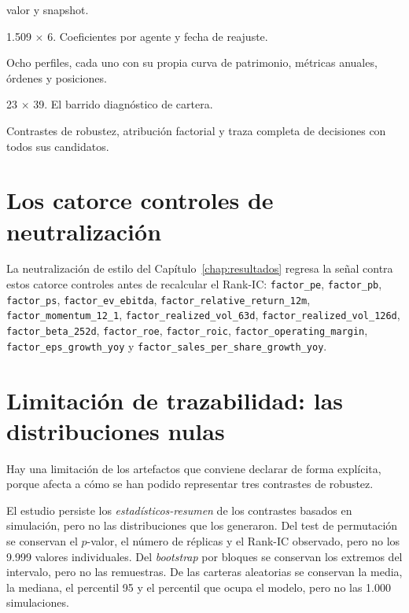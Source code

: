 \begin{description}[leftmargin=0.5cm,style=nextline,font=\normalfont\ttfamily\small]
  valor y snapshot.
  \item[evidence/model\_feature\_attribution.parquet] 1.509 $\times$ 6. Coeficientes por agente y
  fecha de reajuste.
  \item[evidence/profiles/] Ocho perfiles, cada uno con su propia curva de patrimonio, métricas
  anuales, órdenes y posiciones.
  \item[portfolio\_comparison.parquet] 23 $\times$ 39. El barrido diagnóstico de cartera.
  \item[robustness.json, attribution.json, decisions.json] Contrastes de robustez, atribución
  factorial y traza completa de decisiones con todos sus candidatos.
\end{description}

\section{Los catorce controles de neutralización}

La neutralización de estilo del Capítulo~\ref{chap:resultados} regresa la señal contra estos
catorce controles antes de recalcular el Rank-IC: \texttt{factor\_pe}, \texttt{factor\_pb},
\texttt{factor\_ps}, \texttt{factor\_ev\_ebitda}, \texttt{factor\_relative\_return\_12m},
\texttt{factor\_momentum\_12\_1}, \texttt{factor\_realized\_vol\_63d},
\texttt{factor\_realized\_vol\_126d}, \texttt{factor\_beta\_252d}, \texttt{factor\_roe},
\texttt{factor\_roic}, \texttt{factor\_operating\_margin}, \texttt{factor\_eps\_growth\_yoy} y
\texttt{factor\_sales\_per\_share\_growth\_yoy}.

\section{Limitación de trazabilidad: las distribuciones nulas}

Hay una limitación de los artefactos que conviene declarar de forma explícita, porque afecta a cómo
se han podido representar tres contrastes de robustez.

El estudio persiste los \emph{estadísticos-resumen} de los contrastes basados en simulación, pero no
las distribuciones que los generaron. Del test de permutación se conservan el $p$-valor, el número
de réplicas y el Rank-IC observado, pero no los 9.999 valores individuales. Del \textit{bootstrap}
por bloques se conservan los extremos del intervalo, pero no las remuestras. De las carteras
aleatorias se conservan la media, la mediana, el percentil 95 y el percentil que ocupa el modelo,
pero no las 1.000 simulaciones.

